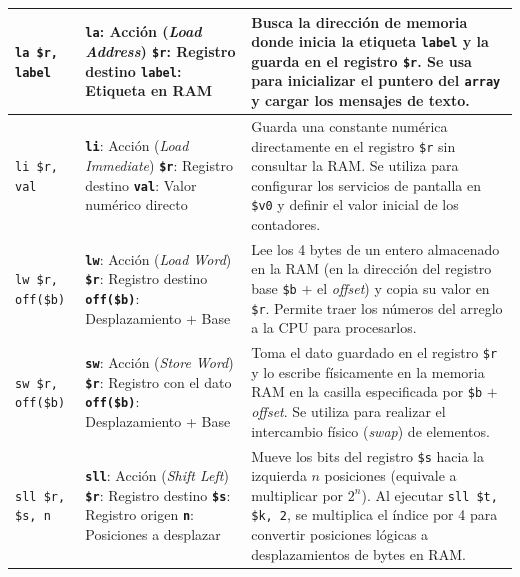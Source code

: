 \documentclass[12pt,a4paper]{article}
\begin{document}
\begin{longtable}{@{} L{2.8cm} L{4.5cm} L{8.3cm}}
\texttt{la \$r, label} & 
\textbf{\texttt{la}}: Acción (\textit{Load Address})\newline
\textbf{\texttt{\$r}}: Registro destino\newline
\textbf{\texttt{label}}: Etiqueta en RAM & 
Busca la dirección de memoria donde inicia la etiqueta \texttt{label} y la guarda en el registro \texttt{\$r}. Se usa para inicializar el puntero del \texttt{array} y cargar los mensajes de texto. \\
\midrule
\texttt{li \$r, val} & 
\textbf{\texttt{li}}: Acción (\textit{Load Immediate})\newline
\textbf{\texttt{\$r}}: Registro destino\newline
\textbf{\texttt{val}}: Valor numérico directo & 
Guarda una constante numérica directamente en el registro \texttt{\$r} sin consultar la RAM. Se utiliza para configurar los servicios de pantalla en \texttt{\$v0} y definir el valor inicial de los contadores. \\
\midrule
\texttt{lw \$r, off(\$b)} & 
\textbf{\texttt{lw}}: Acción (\textit{Load Word})\newline
\textbf{\texttt{\$r}}: Registro destino\newline
\textbf{\texttt{off(\$b)}}: Desplazamiento + Base & 
Lee los 4 bytes de un entero almacenado en la RAM (en la dirección del registro base \texttt{\$b} $+$ el \textit{offset}) y copia su valor en \texttt{\$r}. Permite traer los números del arreglo a la CPU para procesarlos. \\
\midrule
\texttt{sw \$r, off(\$b)} & 
\textbf{\texttt{sw}}: Acción (\textit{Store Word})\newline
\textbf{\texttt{\$r}}: Registro con el dato\newline
\textbf{\texttt{off(\$b)}}: Desplazamiento + Base & 
Toma el dato guardado en el registro \texttt{\$r} y lo escribe físicamente en la memoria RAM en la casilla especificada por \texttt{\$b} $+$ \textit{offset}. Se utiliza para realizar el intercambio físico (\textit{swap}) de elementos. \\
\midrule
\texttt{sll \$r, \$s, n} & 
\textbf{\texttt{sll}}: Acción (\textit{Shift Left})\newline
\textbf{\texttt{\$r}}: Registro destino\newline
\textbf{\texttt{\$s}}: Registro origen\newline
\textbf{\texttt{n}}: Posiciones a desplazar & 
Mueve los bits del registro \texttt{\$s} hacia la izquierda $n$ posiciones (equivale a multiplicar por $2^n$). Al ejecutar \texttt{sll \$t, \$k, 2}, se multiplica el índice por 4 para convertir posiciones lógicas a desplazamientos de bytes en RAM. \\

\end{longtable}
\end{document}
